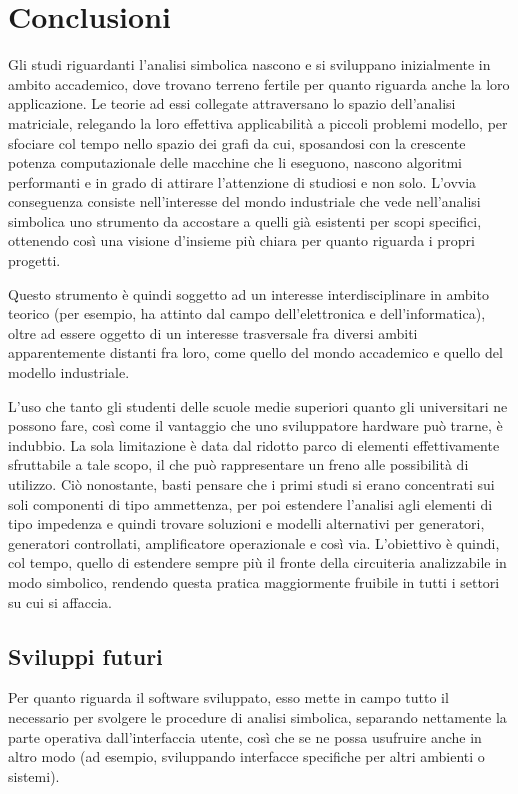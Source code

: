 \chapter{Conclusioni}

Gli studi riguardanti l'analisi simbolica nascono e si sviluppano inizialmente in ambito accademico, dove trovano terreno fertile per quanto riguarda anche la loro applicazione. Le teorie ad essi collegate attraversano lo spazio dell'analisi matriciale, relegando la loro effettiva applicabilità a piccoli problemi modello, per sfociare col tempo nello spazio dei grafi da cui, sposandosi con la crescente potenza computazionale delle macchine che li eseguono, nascono algoritmi performanti e in grado di attirare l'attenzione di studiosi e non solo. L'ovvia conseguenza consiste nell'interesse del mondo industriale che vede nell'analisi simbolica uno strumento da accostare a quelli già esistenti per scopi specifici, ottenendo così una visione d'insieme più chiara per quanto riguarda i propri progetti.

Questo strumento è quindi soggetto ad un interesse interdisciplinare in ambito teorico (per esempio, ha attinto dal campo dell'elettronica e dell'informatica), oltre ad essere oggetto di un interesse trasversale fra diversi ambiti apparentemente distanti fra loro, come quello del mondo accademico e quello del modello industriale.

L'uso che tanto gli studenti delle scuole medie superiori quanto gli universitari ne possono fare, così come il vantaggio che uno sviluppatore hardware può trarne, è indubbio. La sola limitazione è data dal ridotto parco di elementi effettivamente sfruttabile a tale scopo, il che può rappresentare un freno alle possibilità di utilizzo. Ciò nonostante, basti pensare che i primi studi si erano concentrati sui soli componenti di tipo ammettenza, per poi estendere l'analisi agli elementi di tipo impedenza e quindi trovare soluzioni e modelli alternativi per generatori, generatori controllati, amplificatore operazionale e così via. L'obiettivo è quindi, col tempo, quello di estendere sempre più il fronte della circuiteria analizzabile in modo simbolico, rendendo questa pratica maggiormente fruibile in tutti i settori su cui si affaccia.

\section{Sviluppi futuri}
Per quanto riguarda il software sviluppato, esso mette in campo tutto il necessario per svolgere le procedure di analisi simbolica, separando nettamente la parte operativa dall'interfaccia utente, così che se ne possa usufruire anche in altro modo (ad esempio, sviluppando interfacce specifiche per altri ambienti o sistemi).

